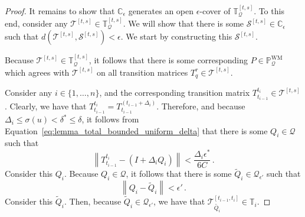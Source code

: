 \documentclass[10pt]{paper}
\theoremstyle{definition}
\newcommand{\processes}{\mathbb{P}}
\newcommand{\wmprocesses}{\processes^{\mathrm{WM}}}
\newcommand{\rateset}{\mathcal{Q}}
\newcommand{\norm}[1]{\left\lVert #1 \right\rVert}
\begin{document}
\begin{proof}
It remains to show that $\mathbb{C}_\epsilon$ generates an open $\epsilon$-cover of $\mathbb{T}_\rateset^{[t,s]}$. To this end, consider any $\mathcal{T}^{[t,s]}\in\mathbb{T}_\rateset^{[t,s]}$. We will show that there is some $\mathcal{S}^{[t,s]}\in \mathbb{C}_{\epsilon}$ such that $d(\mathcal{T}^{[t,s]},\mathcal{S}^{[t,s]})<\epsilon$. We start by constructing this $\mathcal{S}^{[t,s]}$.

Because $\mathcal{T}^{[t,s]}\in\mathbb{T}_\rateset^{[t,s]}$, it follows that there is some corresponding $P\in\wmprocesses_\rateset$ which agrees with $\mathcal{T}^{[t,s]}$ on all transition matrices $T_q^r\in\mathcal{T}^{[t,s]}$. 

Consider any $i\in\{1,\ldots,n\}$, and the corresponding transition matrix $T_{t_{i-1}}^{t_i}\in\mathcal{T}^{[t,s]}$. Clearly, we have that $T_{t_{i-1}}^{t_i}=T_{t_{i-1}}^{(t_{i-1}+\Delta_i)}$. Therefore, and because $\Delta_i\leq\sigma(u)<\delta^*\leq\delta$, it follows from Equation~\eqref{eq:lemma_total_bounded_uniform_delta} that there is some $Q_i\in\rateset$ such that
\begin{equation}\label{eq:lemma_total_bounded_full_interval_error_linear}
\norm{T_{t_{i-1}}^{t_i} - (I+\Delta_i Q_i)} < \frac{\Delta_i\epsilon^*}{6C}\,.
\end{equation}
Consider this $Q_i$. Because $Q_i\in\rateset$, it follows that there is some $\widetilde{Q}_i\in\rateset_{\epsilon'}$ such that
\begin{equation*}
\norm{Q_i - \widetilde{Q}_i} < \epsilon'\,.
\end{equation*}
Consider this $\widetilde{Q}_i$. Then, because $\widetilde{Q}_i\in\rateset_{\epsilon'}$, we have that $\mathcal{T}_{\widetilde{Q_i}}^{[t_{i-1},t_i]}\in\mathbb{T}_i$.


\end{proof}
\end{document}
